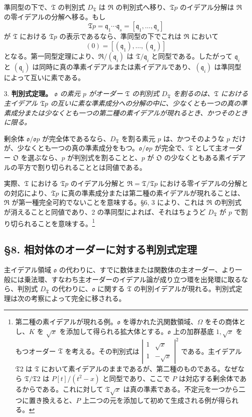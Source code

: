 \documentclass[11pt]{article}
\providecommand{\mR}{\mathfrak{R}}
\providecommand{\mT}{\mathfrak{T}}
\providecommand{\mO}{\mathfrak{O}}
\providecommand{\mo}{\mathfrak{o}}
\providecommand{\mq}{\mathfrak{q}}
\begin{document}
準同型の下で、$\mT$ の判別式 $D_\mT$ は $\mR$ の判別式へ移り、$\mT p$ のイデアル分解は $\mR$ の零イデアルの分解へ移る。もし
\[
        \mT p=\mq_1\cdots\mq_s=[\mq_1,\ldots,\mq_s]
\]
が $\mT$ における $\mT p$ の表示であるなら、準同型の下でこれは $\mR$ において
\[
        (0)=[(\mq_1),\ldots,(\mq_s)]
\]
となる。第一同型定理により、$\mR/(\mq_i)$ は $\mT/\mq_i$ と同型である。したがって $\mq_i$ と $(\mq_i)$ は同時に真の準素イデアルまたは素イデアルであり、$(\mq_i)$ は準同型によって互いに素である。

3. \textbf{判別式定理。} \emph{$\mo$ の素元 $p$ がオーダー $\mT$ の判別式 $D_\mT$ を割るのは、$\mT$ における主イデアル $\mT p$ の互いに素な準素成分への分解の中に、少なくとも一つの真の準素成分または少なくとも一つの第二種の素イデアルが現れるとき、かつそのときに限る。}

剰余体 $\mo/\mo p$ が完全体であるなら、$D_\mT$ を割る素元 $p$ は、かつそのような $p$ だけが、少なくとも一つの真の準素成分をもつ。$\mo/\mo p$ が完全で、$\mT$ として主オーダー $\mO$ を選ぶなら、$p$ が判別式を割ることと、$p$ が $\mO$ の少なくともある素イデアルの平方で割り切られることとは同値である。

実際、$\mT$ における $\mT p$ のイデアル分解と $\mR=\mT/\mT p$ における零イデアルの分解との対応により、$\mT p$ に真の準素成分または第二種の素イデアルが現れることは、$\mR$ が第一種完全可約でないことを意味する。\S 6, 3 により、これは $\mR$ の判別式が消えることと同値であり、2 の準同型によれば、それはちょうど $D_\mT$ が $p$ で割り切られることを意味する。\footnote{第二種の素イデアルが現れる例。$\mo$ を導かれた汎関数領域、$\Omega$ をその商体とし、$K$ を $\sqrt{x}$ を添加して得られる拡大体とする。$\mo$ 上の加群基底 $1,\sqrt{x}$ をもつオーダー $\mT$ を考える。その判別式は $\left|\begin{smallmatrix}1&\sqrt{x}\\1&-\sqrt{x}\end{smallmatrix}\right|^2$ である。主イデアル $\mT2$ は $\mT$ において素イデアルのままであるが、第二種のものである。なぜなら $\mT/\mT2$ は $P[t]/(t^2-x)$ と同型であり、ここで $P$ は対応する剰余体であるからである。これに対して $\mT\sqrt{x}$ は真の準素である。不定元を一つから二つに置き換えると、$P$ 上二つの元を添加して初めて生成される例が得られる。}

\subsection*{\S 8. 相対体のオーダーに対する判別式定理}

主イデアル領域 $\mo$ の代わりに、すでに数体または関数体の主オーダー、より一般には乗法環、すなわち主オーダーのイデアル論が成り立つ環を出発環に取るなら、判別式 $D_\mT$ の代わりに、$\mo$ に関する $\mT$ の判別イデアルが現れる。判別式定理は次の考察によって完全に移される。
\end{document}
